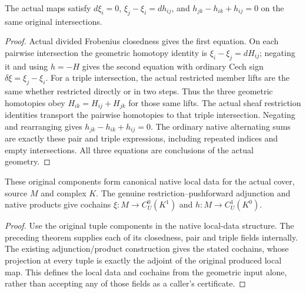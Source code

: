 \begin{lemma}
\label{lem:di-actual-witt-cech-local-equations}
\leanok
{}
The actual maps satisfy $d\xi_i=0$, $\xi_j-\xi_i=dh_{ij}$, and
$h_{jk}-h_{ik}+h_{ij}=0$ on the same original intersections.
\end{lemma}
\begin{proof}
Actual divided Frobenius closedness gives the first equation. On each
pairwise intersection the geometric homotopy identity is
$\xi_i-\xi_j=dH_{ij}$; negating it and using $h=-H$ gives the second
equation with ordinary Cech sign $\delta\xi=\xi_j-\xi_i$.
For a triple intersection, the actual restricted member lifts are the
same whether restricted directly or in two steps. Thus the three geometric
homotopies obey $H_{ik}=H_{ij}+H_{jk}$ for those same lifts. The actual
sheaf restriction identities transport the pairwise homotopies to that
triple intersection. Negating and rearranging gives
$h_{jk}-h_{ik}+h_{ij}=0$. The ordinary native alternating sums are exactly
these pair and triple expressions, including repeated indices and empty
intersections. All three equations are conclusions of the actual geometry.
\end{proof}

\begin{definition}
\label{def:di-actual-witt-canonical-local-data}
\leanok
{}
These original components form canonical native local data for the actual
cover, source $M$ and complex $K$. The genuine restriction--pushforward
adjunction and native products give cochains $\xi:M\to C_U^0(K^1)$ and
$h:M\to C_U^1(K^0)$.
\end{definition}
\begin{proof}
Use the original tuple components in the native local-data structure.
The preceding theorem supplies each of its closedness, pair and triple
fields internally. The existing adjunction/product construction gives the
stated cochains, whose projection at every tuple is exactly the adjoint
of the original produced local map. This defines the local data and
cochains from the geometric input alone, rather than accepting any of
those fields as a caller's certificate.
\end{proof}

